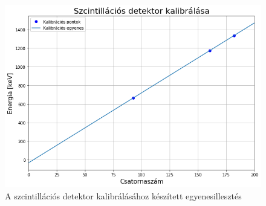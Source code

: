 \documentclass[12pt,a4paper]{article}
\begin{document}
\begin{figure}[!h]
\centering
\includegraphics[scale=0.60]{Szcint_kalib}
\caption{A szcintillációs detektor kalibrálásához készített egyenesillesztés}
\label{fig:4}
\end{figure}
\end{document}
